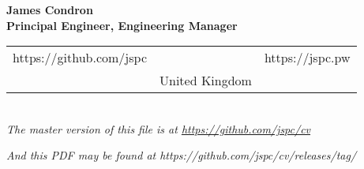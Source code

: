 \begin{center}
  {\huge\textbf{James Condron}}\\
  \textbf{Principal Engineer, Engineering Manager} \\

  \begin{tabular}{rcl}
    https://github.com/jspc & & https://jspc.pw \\
    & United Kingdom &
  \end{tabular} \\

  {\footnotesize\textit{The master version of this file is at \url{https://github.com/jspc/cv}}}

  {\footnotesize\textit{And this PDF may be found at https://github.com/jspc/cv/releases/tag/}}%
  {}

\end{center}
